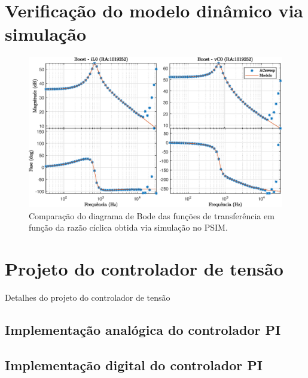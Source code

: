 \section{Verificação do modelo dinâmico via simulação}


\begin{figure}[!ht]
	\centering
	\includegraphics[width=1\linewidth]{Figs/BoostACSweep}
	\caption{Comparação do diagrama de Bode das funções de transferência em função da razão cíclica obtida via simulação no PSIM.}
	\label{fig:ValidacaoModelo}
\end{figure}


\section{Projeto do controlador de tensão}
Detalhes do projeto do controlador de tensão





\subsection{Implementação analógica do controlador PI}





\subsection{Implementação digital do controlador PI}

